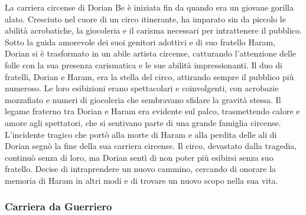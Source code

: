 La carriera circense di Dorian Be è iniziata fin da quando era un
giovane gorilla alato. Cresciuto nel cuore di un circo itinerante, ha
imparato sin da piccolo le abilità acrobatiche, la giocoleria e il
carisma necessari per intrattenere il pubblico. Sotto la guida amorevole
dei suoi genitori adottivi e di suo fratello Haram, Dorian si è
trasformato in un abile artista circense, catturando l'attenzione delle
folle con la sua presenza carismatica e le sue abilità impressionanti.
Il duo di fratelli, Dorian e Haram, era la stella del circo, attirando
sempre il pubblico più numeroso. Le loro esibizioni erano spettacolari e
coinvolgenti, con acrobazie mozzafiato e numeri di giocoleria che
sembravano sfidare la gravità stessa. Il legame fraterno tra Dorian e
Haram era evidente sul palco, trasmettendo calore e amore agli
spettatori, che si sentivano parte di una grande famiglia circense.
L'incidente tragico che portò alla morte di Haram e alla perdita delle
ali di Dorian segnò la fine della sua carriera circense. Il circo,
devastato dalla tragedia, continuò senza di loro, ma Dorian sentì di non
poter più esibirsi senza suo fratello. Decise di intraprendere un nuovo
cammino, cercando di onorare la memoria di Haram in altri modi e di
trovare un nuovo scopo nella sua vita.

\subsubsection{Carriera da Guerriero}\label{carriera-da-guerriero}

